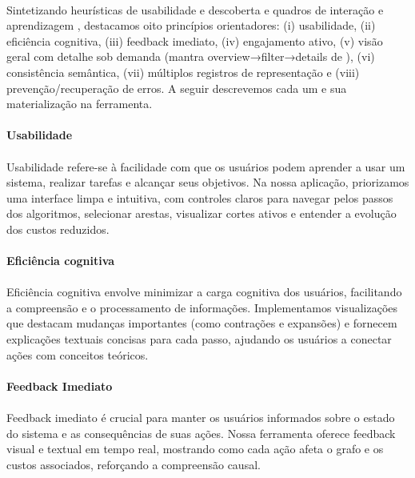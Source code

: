 \documentclass[12pt,a4paper]{article}
\def\emph#1{#1}%
\begin{document}
\paragraph{}
Sintetizando heurísticas de usabilidade e descoberta \cite{nielsen1994heuristics,shneiderman2016designing} e quadros de interação e aprendizagem \cite{rogers2011interaction,mayer2009multimedia,sweller1988cognitive,naps2003engagement}, destacamos oito princípios orientadores: (i) usabilidade, (ii) eficiência cognitiva, (iii) feedback imediato, (iv) engajamento ativo, (v) visão geral com detalhe sob demanda (mantra \emph{overview→filter→details} de \cite{shneiderman1996eyes}), (vi) consistência semântica, (vii) múltiplos registros de representação e (viii) prevenção/recuperação de erros. A seguir descrevemos cada um e sua materialização na ferramenta.


\paragraph{Usabilidade}
\paragraph{}
Usabilidade refere-se à facilidade com que os usuários podem aprender a usar um sistema, realizar tarefas e alcançar seus objetivos. Na nossa aplicação, priorizamos uma interface limpa e intuitiva, com controles claros para navegar pelos passos dos algoritmos, selecionar arestas, visualizar cortes ativos e entender a evolução dos custos reduzidos.

\paragraph{Eficiência cognitiva}
\paragraph{}
Eficiência cognitiva envolve minimizar a carga cognitiva dos usuários, facilitando a compreensão e o processamento de informações. Implementamos visualizações que destacam mudanças importantes (como contrações e expansões) e fornecem explicações textuais concisas para cada passo, ajudando os usuários a conectar ações com conceitos teóricos.

\paragraph{Feedback Imediato}
\paragraph{}
Feedback imediato é crucial para manter os usuários informados sobre o estado do sistema e as consequências de suas ações. Nossa ferramenta oferece feedback visual e textual em tempo real, mostrando como cada ação afeta o grafo e os custos associados, reforçando a compreensão causal.
\end{document}
